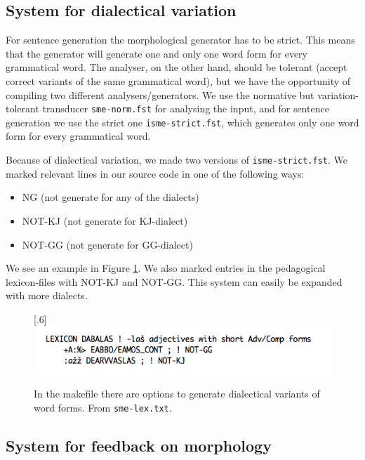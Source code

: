 \documentclass[a4paper,12pt]{article}
\begin{document}
\subsection{System for dialectical variation}\label{dialect}
For sentence generation the morphological generator has to be strict. This means that the generator will generate one and only one word form for every grammatical word. The analyser, on the other hand, should be tolerant (accept correct variants of the same grammatical word), but we have the opportunity of compiling two different analysers/generators. We use the normative but variation-tolerant transducer \texttt{sme-norm.fst} for analysing the input, and for sentence generation we use the strict one \texttt{isme-strict.fst}, which generates only one word form for every grammatical word.

Because of dialectical variation, we made two versions of \texttt{isme-strict.fst}. We marked relevant lines in our source code in one of the following ways:
\begin {itemize}
\item NG (not generate for any of the dialects)
\item NOT-KJ (not generate for KJ-dialect) 
\item NOT-GG (not generate for GG-dialect)  
\end {itemize}

We see an example in Figure \ref{smelex}. We also marked entries in the pedagogical lexicon-files with NOT-KJ and NOT-GG. This system can easily be expanded with more dialects.


\begin{figure}[htbp]
\begin{center}
\scalebox{.6}[.6]{\includegraphics{img/smelex.png}}\\
\caption{In the makefile there are options to generate dialectical variants of word forms. From \texttt{sme-lex.txt}.}
\label{smelex}
\end{center}
\end{figure}

\newpage
\subsection{System for feedback on morphology}
\end{document}

